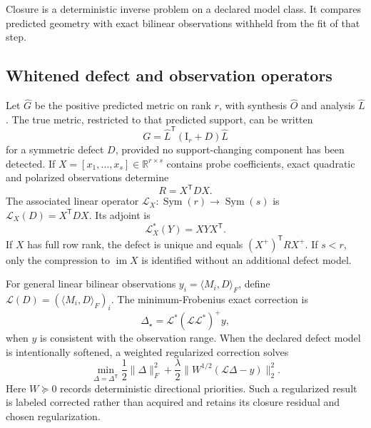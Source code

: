 \documentclass[10pt,twocolumn]{article}
\theoremstyle{definition}
\theoremstyle{remark}
\newcommand{\R}{\mathbb R}
\newcommand{\Id}{\mathrm I}
\newcommand{\im}{\operatorname{im}}
\begin{document}
Closure is a deterministic inverse problem on a declared model class.  It
compares predicted geometry with exact bilinear observations withheld from
the fit of that step.

\subsection{Whitened defect and observation operators}

Let $\widehat G$ be the positive predicted metric on rank $r$, with synthesis
$\widehat O$ and analysis $\widehat L$.  The true metric, restricted to that
predicted support, can be written
\begin{equation}
 G=\widehat L^{\mathsf T}(\Id_r+D)\widehat L
 \label{eq:appdefectfactor}
\end{equation}
for a symmetric defect $D$, provided no support-changing component has been
detected.  If $X=[x_1,\ldots,x_s]\in\R^{r\times s}$ contains probe
coefficients, exact quadratic and polarized observations determine
\begin{equation}
 R=X^{\mathsf T}DX .
 \label{eq:appR}
\end{equation}
The associated linear operator
$\mathcal L_X:\operatorname{Sym}(r)\to\operatorname{Sym}(s)$ is
$\mathcal L_X(D)=X^{\mathsf T}DX$.  Its adjoint is
\begin{equation}
 \mathcal L_X^*(Y)=XYX^{\mathsf T}.
 \label{eq:appLadjoint}
\end{equation}
If $X$ has full row rank, the defect is unique and equals
$(X^+)^{\mathsf T}RX^+$.  If $s<r$, only the compression to $\im X$ is
identified without an additional defect model.

For general linear bilinear observations
$y_i=\langle M_i,D\rangle_F$, define
$\mathcal L(D)=(\langle M_i,D\rangle_F)_i$.  The minimum-Frobenius exact
correction is
\begin{equation}
 \Delta_\star
 =\mathcal L^*(\mathcal L\mathcal L^*)^+y ,
 \label{eq:appminnorm}
\end{equation}
when $y$ is consistent with the observation range.  When the declared defect
model is intentionally softened, a weighted regularized correction solves
\begin{equation}
 \min_{\Delta=\Delta^{\mathsf T}}
 \frac12\|\Delta\|_F^2+
 \frac{\lambda}{2}\|W^{1/2}(\mathcal L\Delta-y)\|_2^2 .
 \label{eq:appweighted}
\end{equation}
Here $W\succeq0$ records deterministic directional priorities.  Such a regularized result is labeled corrected rather
than acquired and retains its closure residual and chosen regularization.
\end{document}
